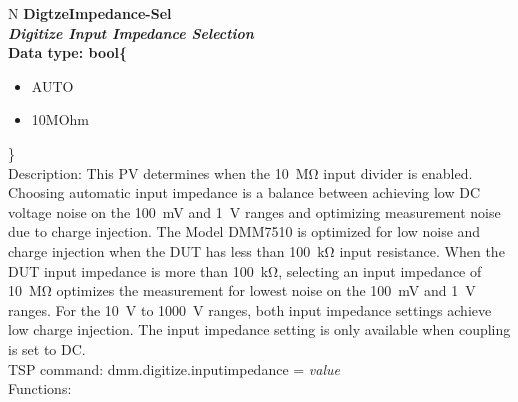 \documentclass[openany]{article}
\begin{document}
		\begin{tabular}{N}
			\hline
			\bfseries DigtzeImpedance-Sel\label{pv:digtzeimpedance-sel} \\ \hline
			\emph{Digitize Input Impedance Selection} \\
			Data type: bool\{\begin{itemize}[noitemsep]
				\small
				\item[] AUTO
				\item[] 10MOhm
			\end{itemize}\} \\
			Description: This PV determines when the \SI{10}{\mega\ohm} input divider is enabled. Choosing automatic input impedance is a balance between achieving low DC voltage noise on the \SI{100}{\milli\volt} and \SI{1}{\volt} ranges and optimizing measurement noise due to charge injection. The Model DMM7510 is optimized for low noise and charge injection when the DUT has less than \SI{100}{\kilo\ohm} input resistance. When the DUT input impedance is more than \SI{100}{\kilo\ohm}, selecting an input impedance of \SI{10}{\mega\ohm} optimizes the measurement for lowest noise on the \SI{100}{\milli\volt} and \SI{1}{\volt} ranges. For the \SI{10}{\volt} to \SI{1000}{\volt} ranges, both input impedance settings achieve low charge injection. The input impedance setting is only available when coupling is set to DC. \\
			TSP command: dmm.digitize.inputimpedance = \emph{value} \\
			Functions: \\
			\arrayrulecolor{\FuncTableBorderColor}

		\end{tabular}
\end{document}
